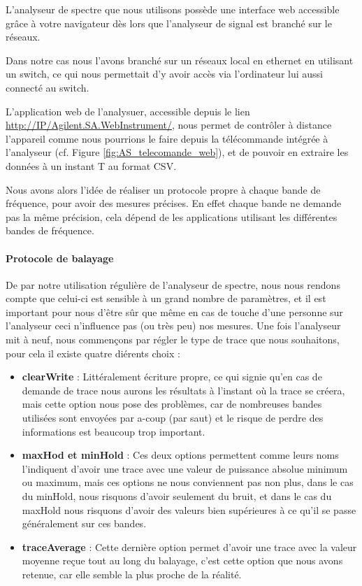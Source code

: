 L'analyseur de spectre que nous utilisons
    possède une interface web accessible grâce à votre navigateur
    dès lors que l'analyseur de signal est branché sur le réseaux.

Dans notre cas nous l'avons branché sur un réseaux local en ethernet
    en utilisant un switch, ce qui nous permettait d'y avoir accès
    via l'ordinateur lui aussi connecté au switch.


L'application web de l'analysuer, accessible depuis le lien \url{http://IP/Agilent.SA.WebInstrument/},
    nous permet de contrôler à distance l'appareil
    comme nous pourrions le faire depuis la  télécommande intégrée à l'analyseur (cf. Figure \ref{fig:AS_telecomande_web}),
    et de pouvoir en extraire les données à un instant T au format CSV.

Nous avons alors l'idée de réaliser un protocole propre à chaque bande de fréquence,
    pour avoir des mesures précises. En effet chaque bande ne demande pas la même précision,
    cela dépend de les applications utilisant les différentes bandes de fréquence.

\paragraph{Protocole de balayage}

De par notre utilisation régulière de l'analyseur de spectre, nous nous rendons compte que celui-ci
    est sensible à un grand nombre de paramètres, et il est important pour nous d'être
    sûr que même en cas de  touche  d'une personne sur l'analyseur ceci n'influence pas
    (ou très peu) nos mesures. Une fois l'analyseur mit à neuf,
    nous commençons par régler le type de trace que nous souhaitons,
    pour cela il existe quatre diérents choix :

    \begin{itemize}
      \item \textbf{clearWrite} : Littéralement écriture propre, ce qui signie qu'en cas de demande
            de trace nous aurons les résultats à l'instant où la trace se créera, mais cette option nous pose des problèmes,
            car de nombreuses bandes utilisées sont envoyées par a-coup (par saut) et
            le risque de perdre des informations est beaucoup trop important.

      \item \textbf{maxHod et minHold} : Ces deux options permettent comme leurs noms
            l'indiquent d'avoir une trace avec une valeur de puissance absolue minimum ou maximum,
            mais ces options ne nous conviennent pas non plus, dans le cas du  minHold,
            nous risquons d'avoir seulement du bruit, et dans le cas du  maxHold
            nous risquons d'avoir des valeurs bien supérieures à ce qu'il se passe
            généralement sur ces bandes.
      \item \textbf{traceAverage} : Cette dernière option permet d'avoir une trace avec la valeur moyenne reçue tout au long du balayage,
            c'est cette option que nous avons retenue, car elle semble la plus proche de la réalité.
    \end{itemize}

